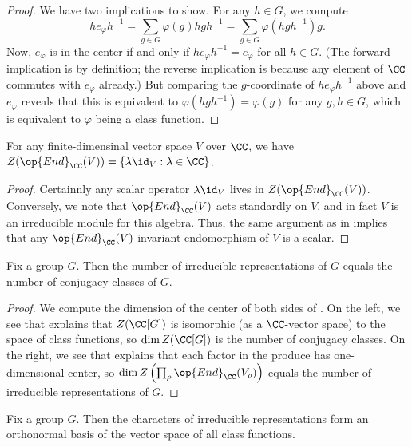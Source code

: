 \documentclass{article}
\begin{document}
\begin{proof}
	We have two implications to show. For any $h\in G$, we compute
	\[he_\varphi h^{-1}=\sum_{g\in G}\varphi(g)hgh^{-1}=\sum_{g\in G}\varphi\left(hgh^{-1}\right)g.\]
	Now, $e_\varphi$ is in the center if and only if $he_\varphi h^{-1}=e_\varphi$ for all $h\in G$. (The forward implication is by definition; the reverse implication is because any element of $\CC$ commutes with $e_\varphi$ already.) But comparing the $g$-coordinate of $he_\varphi h^{-1}$ above and $e_\varphi$ reveals that this is equivalent to $\varphi\left(hgh^{-1}\right)=\varphi(g)$ for any $g,h\in G$, which is equivalent to $\varphi$ being a class function.
\end{proof}
\begin{lemma} \label{lem:center-of-end}
	For any finite-dimensinal vector space $V$ over $\CC$, we have $Z(\op{End}_\CC(V))=\{\lambda{\id_V}:\lambda\in\CC\}$.
\end{lemma}
\begin{proof}
	Certainnly any scalar operator $\lambda\id_V$ lives in $Z(\op{End}_\CC(V))$. Conversely, we note that $\op{End}_\CC(V)$ acts standardly on $V$, and in fact $V$ is an irreducible module for this algebra. Thus, the same argument as in  implies that any $\op{End}_\CC(V)$-invariant endomorphism of $V$ is a scalar.
\end{proof}
\begin{proposition} \label{prop:count-irreps}
	Fix a group $G$. Then the number of irreducible representations of $G$ equals the number of conjugacy classes of $G$.
\end{proposition}
\begin{proof}
	We compute the dimension of the center of both sides of . On the left, we see that  explains that $Z(\CC[G])$ is isomorphic (as a $\CC$-vector space) to the space of class functions, so $\dim Z(\CC[G])$ is the number of conjugacy classes. On the right, we see that  explains that each factor in the produce has one-dimensional center, so $\dim Z\left(\prod_\rho\op{End}_\CC(V_\rho)\right)$ equals the number of irreducible representations of $G$.
\end{proof}
\begin{corollary} \label{cor:irrep-chars-span-class-funcs}
	Fix a group $G$. Then the characters of irreducible representations form an orthonormal basis of the vector space of all class functions.
\end{corollary}
\end{document}
